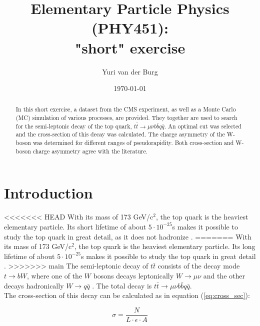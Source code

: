 \documentclass[%
 reprint,
 amsmath,amssymb,
 aps,
]{revtex4-2}
\begin{document}

\title{Elementary Particle Physics (PHY451): \\ "short" exercise}

\author{Yuri van der Burg}

\date{\today}

\begin{abstract}
In this short exercise, a dataset from the CMS experiment, as well as a Monte Carlo (MC) simulation of various processes, are provided. They together are used to search for the semi-leptonic decay of the top quark, $t \bar t \rightarrow \mu \nu b \bar b q \bar q$. An optimal cut was selected and the cross-section of this decay was calculated. The charge asymmetry of the W-boson was determined for different ranges of pseudorapidity. Both cross-section and W-boson charge asymmetry agree with the literature. 
\end{abstract}
\maketitle


\section{\label{sec:introduction}Introduction}
<<<<<<< HEAD
With its mass of 173 GeV/c$^2$, the top quark is the heaviest elementary particle. Its short lifetime of about $5 \cdot 10^{-25}$s makes it possible to study the top quark in great detail, as it does not hadronize \cite{workman_review_2022}.
=======
With its mass of 173 GeV/c$^2$, the top quark is the heaviest elementary particle. Its long lifetime of about $5 \cdot 10^{-25}$s makes it possible to study the top quark in great detail \cite{workman_review_2022}.
>>>>>>> main
The semi-leptonic decay of $t \bar t$ consists of the decay mode $t \rightarrow bW$, where one of the $W$ bosons decays leptonically $W \rightarrow \mu \nu$ and the other decays hadronically $W \rightarrow q \bar q$ \cite{cms_collaboration_measurement_2018}. The total decay is $t \bar t \rightarrow \mu \nu b \bar b q \bar q$. \\
The cross-section of this decay can be calculated as in equation (\ref{eq:cross_sec}):

\begin{equation}\label{eq:cross_sec}
    \sigma = \frac{N}{L \cdot \epsilon \cdot A}
\end{equation}
\end{document}
